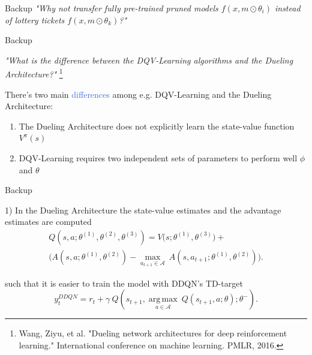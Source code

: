 \documentclass{beamer}
\DeclareMathOperator*{\argmax}{arg\,max}
\begin{document}


\appendix

\begin{frame}{Backup}
	\bigskip
	\textit{"Why not transfer fully pre-trained pruned models $f(x,m\odot\theta_i)$ instead of lottery tickets $f(x,m\odot\theta_k)$?"}
	\bigskip
	

\end{frame}

\begin{frame}{Backup}

	\textit{"What is the difference between the DQV-Learning algorithms and the Dueling Architecture?"} \footnote{Wang, Ziyu, et al. "Dueling network architectures for deep reinforcement learning." International conference on machine learning. PMLR, 2016.}

	\bigskip
	
	There's two main \textcolor{RoyalBlue}{differences} among e.g. DQV-Learning and the Dueling Architecture:
	\begin{enumerate}
		\item The Dueling Architecture does not explicitly learn the state-value function $V^{\pi}(s)$
		\item DQV-Learning requires two independent sets of parameters to perform well $\phi$ and $\theta$
	\end{enumerate}

\end{frame}


\begin{frame}{Backup}

	1) In the Dueling Architecture the state-value estimates and the advantage estimates are computed
	\bigskip
	\begin{multline*}
	Q(s,a;\theta^{(1)},\theta^{(2)},\theta^{(3)}) = V\bigl(s;\theta^{(1)},\theta^{(3)}\bigr) + \\
	\bigl(A(s,a;\theta^{(1)},\theta^{(2)}) - \underset{a_{t+1}\in \mathcal{A}}{\max}\: A(s, a_{t+1};\theta^{(1)},\theta^{(2)}) \bigr).
	\label{eq:dueling}
\end{multline*}
	
	 such that it is easier to train the model with DDQN's TD-target
	\bigskip
	\begin{equation*}
    y^{DDQN}_{t} = r_{t} + \gamma \: Q(s_{t+1}, \underset{a\in \mathcal{A}}{\argmax}\: Q(s_{t+1}, a; \theta); \theta^{-}). 
\end{equation*}

\end{frame}
\end{document}
